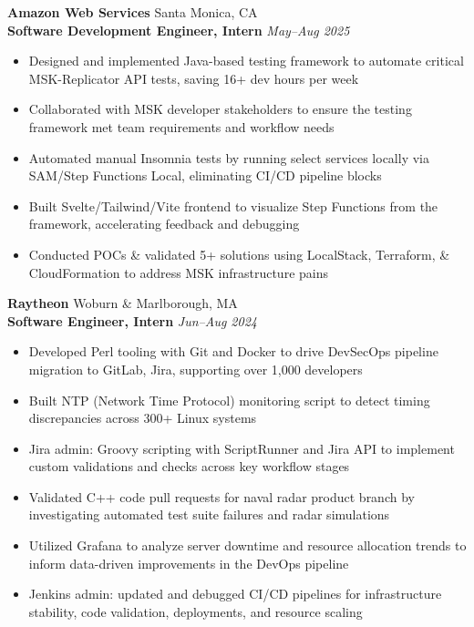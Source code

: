 \documentclass[letterpaper,10pt]{article}
\newcommand{\company}[2]{
    \vspace{7pt}
    {\large \textbf{#1}}
    \hfill
    {\normalsize {#2}}
    \\
}
\newcommand{\position}[2]{
    \vspace{5pt}
    {\normalsize \textbf {#1}}
    \hfill
    {\normalsize \textit{#2}}
    \\
}
\newcommand{\itemsBegin}{
    \begin{itemize}[leftmargin=0.2in, labelsep=0.05in, itemsep=0pt, parsep=1pt, topsep=0pt, partopsep=0pt]
    \small
}
\newcommand{\itemsEnd}{\end{itemize}}
\begin{document}
    \company{Amazon Web Services}{Santa Monica, CA}
    \position{Software Development Engineer, Intern}{May--Aug 2025}
    \itemsBegin{}
        \item Designed and implemented Java-based testing framework to automate critical MSK-Replicator API tests, saving 16+ dev hours per week
        \item Collaborated with MSK developer stakeholders to ensure the testing framework met team requirements and workflow needs
        \item Automated manual Insomnia tests by running select services locally via SAM/Step Functions Local, eliminating CI/CD pipeline blocks
        \item Built Svelte/Tailwind/Vite frontend to visualize Step Functions from the framework, accelerating feedback and debugging
        \item Conducted POCs \& validated 5+ solutions using LocalStack, Terraform, \& CloudFormation to address MSK infrastructure pains
    \itemsEnd{}

    \company{Raytheon}{Woburn \& Marlborough, MA}

    \position{Software Engineer, Intern}{Jun--Aug 2024}
    \itemsBegin{}
        \item Developed Perl tooling with Git and Docker to drive DevSecOps pipeline migration to GitLab, Jira, supporting over 1,000 developers
        \item Built NTP (Network Time Protocol) monitoring script to detect timing discrepancies across 300+ Linux systems
        \item Jira admin: Groovy scripting with ScriptRunner and Jira API to implement custom validations and checks across key workflow stages
        \item Validated C++ code pull requests for naval radar product branch by investigating automated test suite failures and radar simulations
        \item Utilized Grafana to analyze server downtime and resource allocation trends to inform data-driven improvements in the DevOps pipeline
        \item Jenkins admin: updated and debugged CI/CD pipelines for infrastructure stability, code validation, deployments, and resource scaling
    \itemsEnd{}
\end{document}
